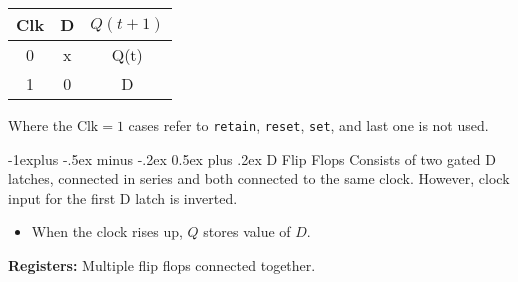 \documentclass[11pt,landscape]{article}
\makeatletter
\renewcommand{\subsection}{\@startsection{subsection}{2}{0mm}%
                                {-1explus -.5ex minus -.2ex}%
                                {0.5ex plus .2ex}%
                                {\normalfont\normalsize\bfseries}}
\makeatother
\begin{document}
\begin{multicols}{3}
{\begin{multicols}{2}
\begin{center}
        \end{center}


        \begin{center}
            \begin{tabular}{c|c|c}
                Clk & D & $Q(t+1)$ \\ \hline
                0 & x & Q(t) \\
                1 & 0 & D
           \end{tabular}
        \end{center}
        \vspace{-3mm}
        \scriptsize Where the $\text{Clk}=1$ cases refer to \verb!retain!, \verb!reset!, \verb!set!, and last one is not used.
    \end{multicols}
}

\subsection{D Flip Flops}
Consists of two gated D latches, connected in series and both connected to the same clock. However, clock input for the first D latch is inverted.
\begin{itemize}
    \item When the clock rises up, $Q$ stores value of $D$.
\end{itemize}
\textbf{Registers:} Multiple flip flops connected together.
\end{multicols}
\end{document}
